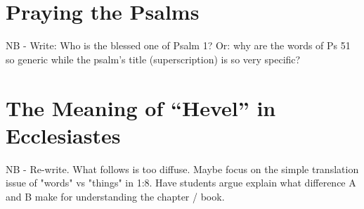 \documentclass[12pt]{article}
\begin{document}
\section{Praying the Psalms}


NB - Write: Who is the blessed one of Psalm 1? Or: why are the words of Ps 51 so generic while the psalm's title (superscription) is so very specific?

\section{The Meaning of “Hevel” in Ecclesiastes}

NB - Re-write. What follows is too diffuse. Maybe focus on the simple translation issue of "words" vs "things" in 1:8. Have students argue explain what difference A and B make for understanding the chapter / book.

%
%
%
\end{document}
